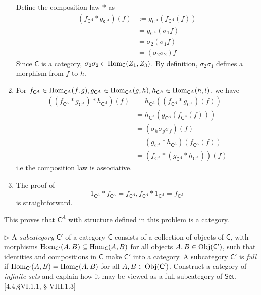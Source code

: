 \begin{solution}
\begin{enumerate}
Define the composition law $\ast$ as 
\begin{equation*}
\begin{split}(f_{\mathsf{C}^{A}} \ast g_{\mathsf{C}^{A}})(f) &:= g_{\mathsf{C}^{A}}(f_{\mathsf{C}^{A}}(f)) \\
&=g_{\mathsf{C}^{A}}(\sigma_1 f)\\
&=\sigma_2(\sigma_1 f) \\
&=(\sigma_2\sigma_2)f
\end{split}
\end{equation*}
Since $\mathsf{C}$ is a category, $\sigma_2\sigma_2 \in \mathrm{Hom}_{\mathsf{C}}(Z_1, Z_3)$. By definition, $\sigma_2\sigma_1$ defines 
a morphism from $f$ to $h$.
\item For $f_{\mathsf{C}^{A}}\in \mathrm{Hom}_{\mathsf{C}^{A}}(f, g), g_{\mathsf{C}^{A}}\in \mathrm{Hom}_{\mathsf{C}^{A}}(g, h), 
h_{\mathsf{C}^{A}}\in \mathrm{Hom}_{\mathsf{C}^{A}}(h, l)$, we have
\begin{equation*}
\begin{split}
((f_{\mathsf{C}^{A}}\ast g_{\mathsf{C}^{A}})\ast h_{\mathsf{C}^{A}})(f) &= h_{\mathsf{C}^{A}}((f_{\mathsf{C}^{A}}\ast g_{\mathsf{C}^{A}})(f))\\
&=h_{\mathsf{C}^{A}}(g_{\mathsf{C}^{A}}(f_{\mathsf{C}^{A}}(f))) \\&= (\sigma_h\sigma_g\sigma_f)(f)\\
&=(g_{\mathsf{C}^{A}}\ast h_{\mathsf{C}^{A}})(f_{\mathsf{C}^{A}}(f))\\
&=(f_{\mathsf{C}^{A}}\ast (g_{\mathsf{C}^{A}}\ast h_{\mathsf{C}^{A}}))(f)
\end{split}
\end{equation*}
i.e the composition law is associative.
\item The proof of $$1_{\mathsf{C}^{A}}\ast f_{\mathsf{C}^{A}}= f_{\mathsf{C}^{A}}, f_{\mathsf{C}^{A}}\ast 1_{\mathsf{C}^{A}} = f_{\mathsf{C}^{A}}$$ is straightforward.
\end{enumerate}
This proves that $\mathsf{C}^{A}$ with structure defined in this problem is a category.
\end{solution}

\begin{problem}[3.8]
  $\rhd$ A \textit{subcategory} ${\mathsf{C}'}$ of a category $\mathsf{C}$ consists of a
  collection of objects of $\mathsf{C}$, with morphisms
  $\mathrm{Hom}_{\mathsf{C}'}(A,B) \subseteq \mathrm{Hom}_\mathsf{C}(A,B)$ for all objects $A,B\in\mathrm{Obj}({\mathsf{C}'})$, such
  that identities and compositions in $\mathsf{C}$ make ${\mathsf{C}'}$ into a category. A
  subcategory ${\mathsf{C}'}$ is \textit{full} if $\mathrm{Hom}_{\mathsf{C}'}(A,B) = \mathrm{Hom}_\mathsf{C}(A,B)$ for all
  $A,B\in\mathrm{Obj}({\mathsf{C}'})$. Construct a category of \textit{infinite sets} and explain
  how it may be viewed as a full subcategory of $\mathsf{Set}$. [4.4,\S VI.1.1, \S
  VIII.1.3]
\end{problem}

